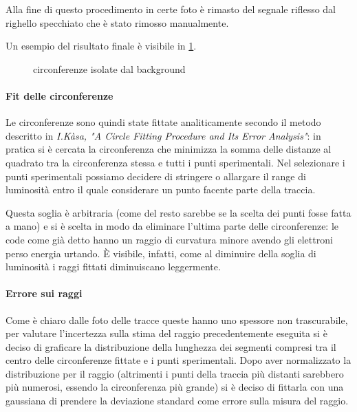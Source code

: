 Alla fine di questo procedimento in certe foto è rimasto del segnale riflesso dal righello specchiato che è stato rimosso manualmente.

Un esempio del risultato finale è visibile in \figurename{ \ref{circ}}.

\begin{figure}[H]
	\centering
	\caption{circonferenze isolate dal background}
	\label{circ}
\end{figure}

\paragraph{Fit delle circonferenze} Le circonferenze sono quindi state fittate analiticamente secondo il metodo descritto in \emph{I.Kàsa, "A Circle Fitting Procedure and Its Error Analysis"}: in pratica si è cercata la circonferenza che minimizza la somma delle distanze al quadrato tra la circonferenza stessa e tutti i punti sperimentali.
Nel selezionare i punti sperimentali possiamo decidere di stringere o allargare il range di luminosità entro il quale considerare un punto facente parte della traccia.

Questa soglia è arbitraria (come del resto sarebbe se la scelta dei punti fosse fatta a mano) e si è scelta in modo da eliminare l'ultima parte delle circonferenze: le code come già detto hanno un raggio di curvatura minore avendo gli elettroni perso energia urtando. È visibile, infatti, come al diminuire della soglia di luminosità i raggi fittati diminuiscano leggermente.

\paragraph{Errore sui raggi} Come è chiaro dalle foto delle tracce queste hanno uno spessore non trascurabile, per valutare l'incertezza sulla stima del raggio precedentemente eseguita si è deciso di graficare la distribuzione della lunghezza dei segmenti compresi tra il centro delle circonferenze fittate e i punti sperimentali.
Dopo aver normalizzato la distribuzione per il raggio (altrimenti i punti della traccia più distanti sarebbero più numerosi, essendo la circonferenza più grande) si è deciso di fittarla con una gaussiana di prendere la deviazione standard come errore sulla misura del raggio.

